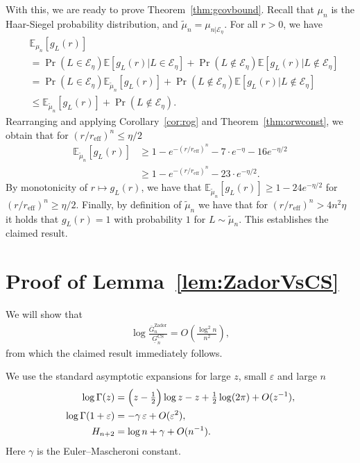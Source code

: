 \documentclass[article,doublecolumn]{IEEEtran}
\newcommand{\EE}{{\mathbb{E}}}
\newcommand{\eps}{\varepsilon}
\newcommand{\reff}{{r_{\mathrm{eff}}}}
\newcommand{\VcdfL}{g_L}
\begin{document}
With this, we are ready to prove Theorem~\ref{thm:gcovbound}. Recall that $\mu_n$ is the Haar-Siegel probability distribution, and $\tilde{\mu}_n=\mu_{n|\mathcal{E}_\eta}$. For all $r>0$, we have
\begin{align}
&\EE_{\mu_n}[\VcdfL(r)]\nonumber\\
&=\Pr(L\in \mathcal{E}_\eta)\EE[\VcdfL(r)|L\in\mathcal{E}_\eta]+\Pr(L\notin \mathcal{E}_\eta)\EE[\VcdfL(r)|L\notin\mathcal{E}_\eta]\\
&=\Pr(L\in \mathcal{E}_\eta)\EE_{\tilde{\mu}_n}[\VcdfL(r)]+\Pr(L\notin \mathcal{E}_\eta)\EE[\VcdfL(r)|L\notin\mathcal{E}_\eta]\\
&\leq \EE_{\tilde{\mu}_n}[\VcdfL(r)]+ \Pr(L\notin \mathcal{E}_\eta).
\end{align}
Rearranging and applying Corollary~\ref{cor:rog} and Theorem~\ref{thm:orwconst}, we obtain that for $(r/\reff)^n\leq \eta/2$
\begin{align}
\EE_{\tilde{\mu}_n}[\VcdfL(r)]&\geq   1-e^{-(r/\reff)^n}- 7 \cdot e^{-\eta}-  16 e^{-\eta/2}\\
&\geq 1-e^{-(r/\reff)^n}- 23 \cdot e^{-\eta/2}.
\end{align}
By monotonicity of $r\mapsto \VcdfL(r)$, we have that $\EE_{\tilde{\mu}_n}[\VcdfL(r)]\geq 1-24 e^{-\eta/2}$ for $(r/\reff)^n\geq\eta/2$.
Finally, by definition of $\tilde{\mu}_n$ we have that for $(r/\reff)^n> 4 n^2 \eta$ it holds that $\VcdfL(r)=1$ with probability $1$ for $L\sim\tilde{\mu}_n$. This establishes the claimed result.


\section{Proof of Lemma~\ref{lem:ZadorVsCS}}
\label{app:Zador_CS}

We will show that
\begin{align}
\log \frac{\overline{G}_n^{\mathrm{Zador}}}{\underline{G}^{\mathrm{CS}}_n}=O\left(\frac{\log^2{n}}{n^2} \right),    
\end{align}
from which the claimed result immediately follows.




We use the standard asymptotic expansions for large $z$, small $\eps$ and large $n$~\cite[6.141, 6.133]{abramowitz1965handbook}~\cite[Chapter 6.3]{graham1994concrete}
\begin{align}
\log\Gamma(z)
&=\Bigl(z-\tfrac12\Bigr)\log z - z + \tfrac12\log(2\pi)
+O(z^{-1}), \label{eq:stirling}\\
\log\Gamma(1+\varepsilon)
&=-\gamma\,\varepsilon+O(\varepsilon^2),
 \label{eq:taylorGamma}\\
H_{n+2}
&=\log n+\gamma+O(n^{-1}). \label{eq:harmonic}
\end{align}
Here $\gamma$ is the Euler--Mascheroni constant.
\end{document}
